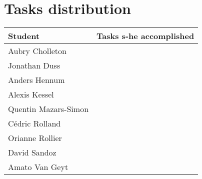 \section{Tasks distribution}
\begin{tabular}{|l|l|}
\hline
\textbf{Student} & \textbf{Tasks s-he accomplished} \\
\hline
Aubry Cholleton & \\
\hline
Jonathan Duss & \\
\hline
Anders Hennum & \\
\hline
Alexis Kessel & \\
\hline
Quentin Mazars-Simon & \\
\hline
Cédric Rolland & \\
\hline
Orianne Rollier & \\
\hline
David Sandoz & \\
\hline
Amato Van Geyt & \\
\hline
\end{tabular}
